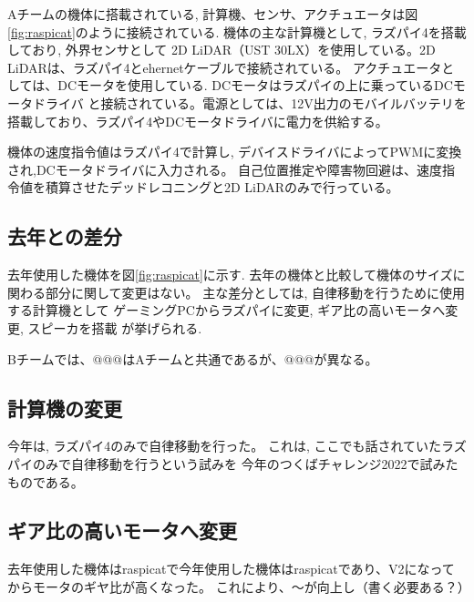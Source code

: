 \documentclass[twocolumn,9pt]{jsproceedings}
\begin{document}
Aチームの機体に搭載されている, 計算機、センサ、アクチュエータは図\ref{fig:raspicat}のように接続されている.
機体の主な計算機として, ラズパイ4を搭載しており, 外界センサとして
2D LiDAR（UST 30LX）を使用している。2D LiDARは、ラズパイ4とehernetケーブルで接続されている。
アクチュエータとしては、DCモータを使用している. DCモータはラズパイの上に乗っているDCモータドライバ
と接続されている。電源としては、12V出力のモバイルバッテリを搭載しており、ラズパイ4やDCモータドライバに電力を供給する。

機体の速度指令値はラズパイ4で計算し, デバイスドライバによってPWMに変換され,DCモータドライバに入力される。
自己位置推定や障害物回避は、速度指令値を積算させたデッドレコニングと2D LiDARのみで行っている。

\subsection{去年との差分} %
 
去年使用した機体を図\ref{fig:raspicat}に示す. 
去年の機体と比較して機体のサイズに関わる部分に関して変更はない。
主な差分としては, 自律移動を行うために使用する計算機として
ゲーミングPCからラズパイに変更, ギア比の高いモータへ変更, スピーカを搭載
が挙げられる.

Bチームでは、@@@はAチームと共通であるが、@@@が異なる。



\subsection{計算機の変更}

今年は, ラズパイ4のみで自律移動を行った。%
これは, ここでも話されていたラズパイのみで自律移動を行うという試みを
今年のつくばチャレンジ2022で試みたものである。

\subsection{ギア比の高いモータへ変更}

去年使用した機体はraspicatで今年使用した機体はraspicatであり、V2になってからモータのギヤ比が高くなった。
これにより、〜が向上し（書く必要ある？）%
\end{document}
